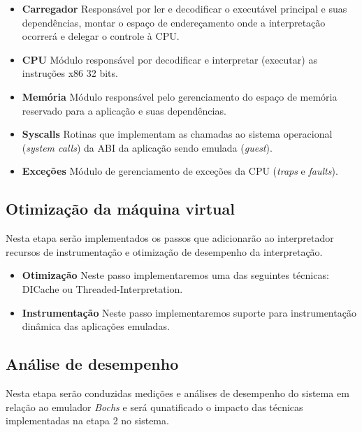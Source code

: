 \documentclass[11pt,twoside]{article}
\begin{document}
\begin{itemize}
 \item \textbf{Carregador} Responsável por ler e decodificar o executável principal e suas dependências, montar o espaço de endereçamento onde a interpretação ocorrerá e delegar o controle à CPU.
 \item \textbf{CPU} Módulo responsável por decodificar e interpretar (executar) as instruções x86 32 bits.
 \item \textbf{Memória} Módulo responsável pelo gerenciamento do espaço de memória reservado para a aplicação e suas dependências.
 \item \textbf{Syscalls} Rotinas que implementam as chamadas ao sistema operacional (\emph{system calls}) da ABI da aplicação sendo emulada (\emph{guest}).
 \item \textbf{Exceções} Módulo de gerenciamento de exceções da CPU (\emph{traps} e \emph{faults}).
\end{itemize}

\subsection{Otimização da máquina virtual}

Nesta etapa serão implementados os passos que adicionarão ao interpretador recursos de instrumentação e otimização de desempenho da interpretação.

\begin{itemize}
 \item \textbf{Otimização} Neste passo implementaremos uma das seguintes técnicas: DICache\cite{Chen2012} ou Threaded-Interpretation\cite{Klint1981}.
 \item \textbf{Instrumentação} Neste passo implementaremos suporte para instrumentação dinâmica das aplicações emuladas.
\end{itemize}
 
\subsection{Análise de desempenho}

Nesta etapa serão conduzidas medições e análises de desempenho do sistema em relação ao emulador \emph{Bochs} e será qunatificado o impacto das técnicas implementadas na etapa 2 no sistema.
\end{document}
